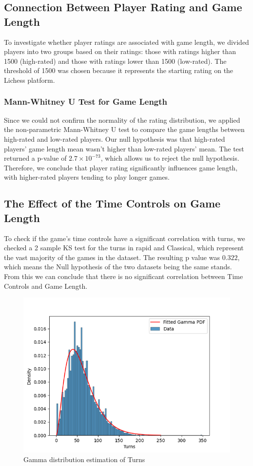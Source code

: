 \documentclass[conference]{IEEEtran}
\begin{document}
\subsection{Connection Between Player Rating and Game Length}
To investigate whether player ratings are associated with game length, we divided players into two groups based on their ratings: those with ratings higher than 1500 (high-rated) and those with ratings lower than 1500 (low-rated). The threshold of 1500 was chosen because it represents the starting rating on the Lichess platform.
\subsubsection*{Mann-Whitney U Test for Game Length}
Since we could not confirm the normality of the rating distribution, we applied the non-parametric Mann-Whitney U test to compare the game lengths between high-rated and low-rated players. Our null hypothesis was that high-rated players' game length mean wasn't higher than low-rated players' mean. The test returned a p-value of \(2.7 \times 10^{-73}\), which allows us to reject the null hypothesis. Therefore, we conclude that player rating significantly influences game length, with higher-rated players tending to play longer games.

\subsection{The Effect of the Time Controls on Game Length}
To check if the game's time controls have a significant correlation with turns, we checked a 2 sample KS test for the turns in rapid and Classical, which represent the vast majority of the games in the dataset. The resulting p value was $0.322$, which means the Null hypothesis of the two datasets being the same stands. From this we can conclude that there is no significant correlation between Time Controls and Game Length.

\begin{figure}[H]
    \centering
    \includegraphics[width=0.8\linewidth]{gamma_fit.png}
    \caption{Gamma distribution estimation of Turns}
    \label{fig:gamma_fit}
\end{figure}
\end{document}
